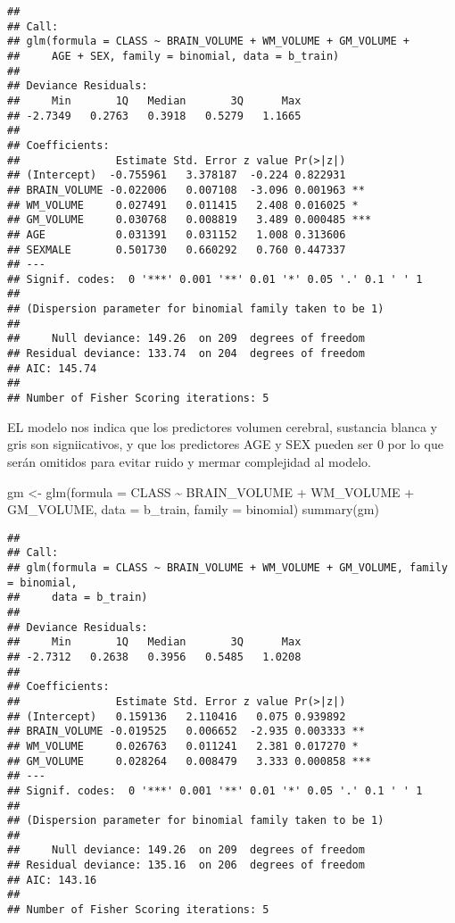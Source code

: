 \documentclass[
]{article}
\newenvironment{Shaded}{\begin{snugshade}}{\end{snugshade}}
\newcommand{\AttributeTok}[1]{\textcolor[rgb]{0.77,0.63,0.00}{#1}}
\newcommand{\FunctionTok}[1]{\textcolor[rgb]{0.00,0.00,0.00}{#1}}
\newcommand{\NormalTok}[1]{#1}
\newcommand{\OtherTok}[1]{\textcolor[rgb]{0.56,0.35,0.01}{#1}}
\newcommand{\SpecialCharTok}[1]{\textcolor[rgb]{0.00,0.00,0.00}{#1}}
\begin{document}
\begin{verbatim}
## 
## Call:
## glm(formula = CLASS ~ BRAIN_VOLUME + WM_VOLUME + GM_VOLUME + 
##     AGE + SEX, family = binomial, data = b_train)
## 
## Deviance Residuals: 
##     Min       1Q   Median       3Q      Max  
## -2.7349   0.2763   0.3918   0.5279   1.1665  
## 
## Coefficients:
##               Estimate Std. Error z value Pr(>|z|)    
## (Intercept)  -0.755961   3.378187  -0.224 0.822931    
## BRAIN_VOLUME -0.022006   0.007108  -3.096 0.001963 ** 
## WM_VOLUME     0.027491   0.011415   2.408 0.016025 *  
## GM_VOLUME     0.030768   0.008819   3.489 0.000485 ***
## AGE           0.031391   0.031152   1.008 0.313606    
## SEXMALE       0.501730   0.660292   0.760 0.447337    
## ---
## Signif. codes:  0 '***' 0.001 '**' 0.01 '*' 0.05 '.' 0.1 ' ' 1
## 
## (Dispersion parameter for binomial family taken to be 1)
## 
##     Null deviance: 149.26  on 209  degrees of freedom
## Residual deviance: 133.74  on 204  degrees of freedom
## AIC: 145.74
## 
## Number of Fisher Scoring iterations: 5
\end{verbatim}

EL modelo nos indica que los predictores volumen cerebral, sustancia
blanca y gris son signiicativos, y que los predictores AGE y SEX pueden
ser 0 por lo que serán omitidos para evitar ruido y mermar complejidad
al modelo.

\begin{Shaded}
\begin{Highlighting}[]
\NormalTok{gm }\OtherTok{\textless{}{-}} \FunctionTok{glm}\NormalTok{(}\AttributeTok{formula =}\NormalTok{ CLASS }\SpecialCharTok{\textasciitilde{}}\NormalTok{ BRAIN\_VOLUME  }\SpecialCharTok{+}\NormalTok{ WM\_VOLUME }\SpecialCharTok{+}\NormalTok{ GM\_VOLUME, }\AttributeTok{data =}\NormalTok{ b\_train, }\AttributeTok{family =}\NormalTok{ binomial)}
\FunctionTok{summary}\NormalTok{(gm)}
\end{Highlighting}
\end{Shaded}

\begin{verbatim}
## 
## Call:
## glm(formula = CLASS ~ BRAIN_VOLUME + WM_VOLUME + GM_VOLUME, family = binomial, 
##     data = b_train)
## 
## Deviance Residuals: 
##     Min       1Q   Median       3Q      Max  
## -2.7312   0.2638   0.3956   0.5485   1.0208  
## 
## Coefficients:
##               Estimate Std. Error z value Pr(>|z|)    
## (Intercept)   0.159136   2.110416   0.075 0.939892    
## BRAIN_VOLUME -0.019525   0.006652  -2.935 0.003333 ** 
## WM_VOLUME     0.026763   0.011241   2.381 0.017270 *  
## GM_VOLUME     0.028264   0.008479   3.333 0.000858 ***
## ---
## Signif. codes:  0 '***' 0.001 '**' 0.01 '*' 0.05 '.' 0.1 ' ' 1
## 
## (Dispersion parameter for binomial family taken to be 1)
## 
##     Null deviance: 149.26  on 209  degrees of freedom
## Residual deviance: 135.16  on 206  degrees of freedom
## AIC: 143.16
## 
## Number of Fisher Scoring iterations: 5
\end{verbatim}
\end{document}
